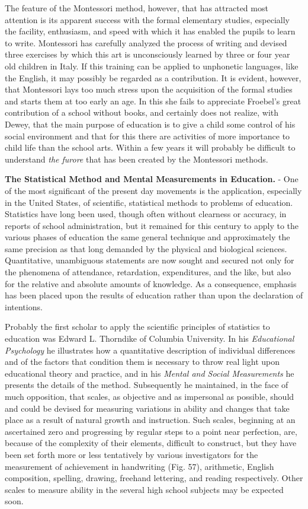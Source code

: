\documentclass[]{book}
\begin{document}
The feature of the Montessori method, however, that has attracted most attention is its apparent success with the formal elementary studies, especially the facility, enthusiasm, and speed with which it has enabled the pupils to learn to write. Montessori has carefully analyzed the process of writing and devised three exercises by which this art is unconsciously learned by three or four year old children in Italy. If this training can be applied to unphonetic languages, like the English, it may possibly be regarded as a contribution. It is evident, however, that Montessori lays too much stress upon the acquisition of the formal studies and starts them at too early an age. In this she fails to appreciate Froebel's great contribution of a school without books, and certainly does not realize, with Dewey, that the main purpose of education is to give a child some control of his social environment and that for this there are activities of more importance to child life than the school arts. Within a few years it will probably be difficult to understand \emph{the furore} that has been created by the Montessori methods.

\textbf{The Statistical Method and Mental Measurements in Education.} - One of the most significant of the present day movements is the application, especially in the United States, of scientific, statistical methods to problems of education. Statistics have long been used, though often without clearness or accuracy, in reports of school administration, but it remained for this century to apply to the various phases of education the same general technique and approximately the same precision as that long demanded by the physical and biological sciences. Quantitative, unambiguous statements are now sought and secured not only for the phenomena of attendance, retardation, expenditures, and the like, but also for the relative and absolute amounts of knowledge. As a consequence, emphasis has been placed upon the results of education rather than upon the declaration of intentions.

Probably the first scholar to apply the scientific principles of statistics to education was Edward L. Thorndike of Columbia University. In his \emph{Educational Psychology} he illustrates how a quantitative description of individual differences and of the factors that condition them is necessary to throw real light upon educational theory and practice, and in his \emph{Mental and Social Measurements} he presents the details of the method. Subsequently he maintained, in the face of much opposition, that scales, as objective and as impersonal as possible, should and could be devised for measuring variations in ability and changes that take place as a result of natural growth and instruction. Such scales, beginning at an ascertained zero and progressing by regular steps to a point near perfection, are, because of the complexity of their elements, difficult to construct, but they have been set forth more or less tentatively by various investigators for the measurement of achievement in handwriting (Fig. 57), arithmetic, English composition, spelling, drawing, freehand lettering, and reading respectively. Other scales to measure ability in the several high school subjects may be expected soon.
\end{document}
